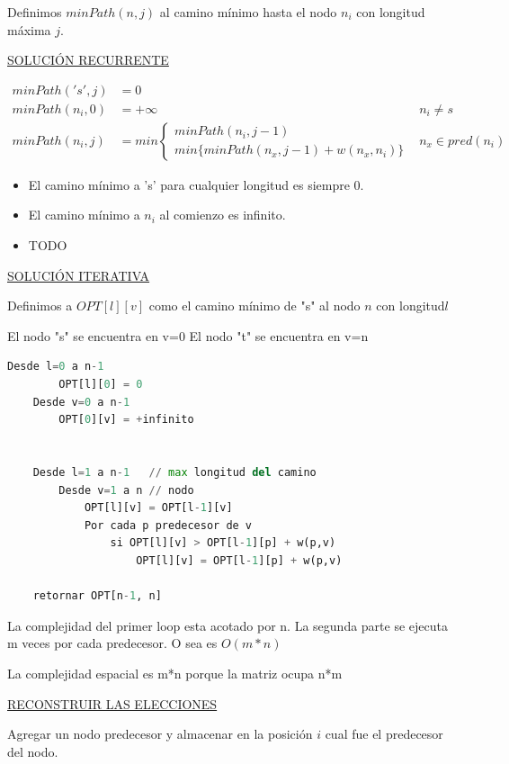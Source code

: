 \documentclass{article}
\begin{document}
Definimos \(minPath(n,j)\) al camino mínimo hasta el nodo \(n_i\) con longitud máxima \(j\).

\underline{SOLUCIÓN RECURRENTE}

\begin{align*}
minPath('s', j) &= 0 \\
minPath(n_i, 0) &= +\infty & n_i \neq s \\
minPath(n_i, j) &=min\left\{\begin{array}{ll}
                minPath(n_i, j-1)              \\
                min \{minPath(n_x, j-1) + w(n_x, n_i)\}          
        \end{array}\right. & n_x \in pred(n_i)
\end{align*}

\begin{itemize}
    \item El camino mínimo a 's' para cualquier longitud es siempre 0.
    \item El camino mínimo a \(n_i\) al comienzo es infinito.
    \item TODO
\end{itemize}

\underline{SOLUCIÓN ITERATIVA}

Definimos a \(OPT[l][v]\) como el camino mínimo de "s" al nodo \(n\) con longitud\(l\)

El nodo "s" se encuentra en v=0
El nodo "t" se encuentra en v=n

\begin{lstlisting}[language=Python, caption=Algoritmo de requeridos con cupos]
    Desde l=0 a n-1
        OPT[l][0] = 0
    Desde v=0 a n-1
        OPT[0][v] = +infinito


    Desde l=1 a n-1   // max longitud del camino
        Desde v=1 a n // nodo
            OPT[l][v] = OPT[l-1][v]
            Por cada p predecesor de v
                si OPT[l][v] > OPT[l-1][p] + w(p,v)
                    OPT[l][v] = OPT[l-1][p] + w(p,v)
                   
    retornar OPT[n-1, n]
\end{lstlisting}

La complejidad del primer loop esta acotado por n. La segunda parte se ejecuta m veces por cada predecesor.
O sea es \(O(m*n)\)

La complejidad espacial es m*n porque la matriz ocupa n*m

\underline{RECONSTRUIR LAS ELECCIONES}

Agregar un nodo predecesor y almacenar en la posición \(i\) cual fue el predecesor del nodo.
\end{document}
